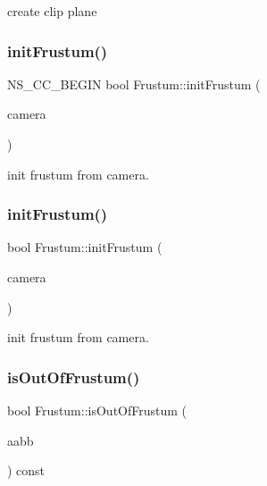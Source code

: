 create clip plane \mbox{\label{classFrustum_a763ea95a5a61afb4ea0d0396fd49ab33}} 
\subsubsection{\texorpdfstring{init\+Frustum()}{initFrustum()}\hspace{0.1cm}{\footnotesize\ttfamily [1/2]}}
{\footnotesize\ttfamily N\+S\+\_\+\+C\+C\+\_\+\+B\+E\+G\+IN bool Frustum\+::init\+Frustum (\begin{DoxyParamCaption}\item[{const \hyperlink{classCamera}{Camera} $\ast$}]{camera }\end{DoxyParamCaption})}

init frustum from camera. \mbox{\label{classFrustum_a3dda1026433e9335df72c7ce893cc5c6}} 
\subsubsection{\texorpdfstring{init\+Frustum()}{initFrustum()}\hspace{0.1cm}{\footnotesize\ttfamily [2/2]}}
{\footnotesize\ttfamily bool Frustum\+::init\+Frustum (\begin{DoxyParamCaption}\item[{const \hyperlink{classCamera}{Camera} $\ast$}]{camera }\end{DoxyParamCaption})}

init frustum from camera. \mbox{\label{classFrustum_a618fd2d27f0337512ca1b1aeee8580e1}} 
\subsubsection{\texorpdfstring{is\+Out\+Of\+Frustum()}{isOutOfFrustum()}\hspace{0.1cm}{\footnotesize\ttfamily [1/4]}}
{\footnotesize\ttfamily bool Frustum\+::is\+Out\+Of\+Frustum (\begin{DoxyParamCaption}\item[{const \hyperlink{classAABB}{A\+A\+BB} \&}]{aabb }\end{DoxyParamCaption}) const}

